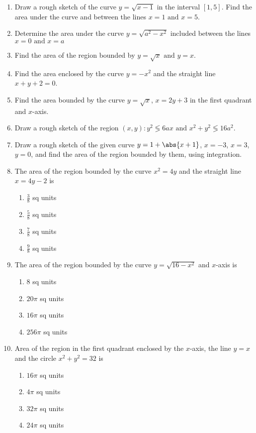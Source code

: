 \begin{enumerate}[label=\thesubsection.\arabic*,ref=\thesubsection.\theenumi]
\item Draw a rough sketch of the curve $y = \sqrt{x - 1}$ in the interval $[1, 5]$. Find the area under the curve and between the lines $x = 1\text{ and }x = 5$.
\item Determine the area under the curve $y = \sqrt{a^2 - x^2}$ included between the lines $x = 0\text{ and }x = a$
\item Find the area of the region bounded by $y = \sqrt{x}\text{ and }y = x$.
\item Find the area enclosed by the curve $y = - x^2$ and the straight line $x + y + 2 = 0$.
\item Find the area bounded by the curve $y = \sqrt{x}$, $x = 2y + 3$ in the first quadrant and $x$-axis.
\item Draw a rough sketch of the region ${(x, y) : y^2 \lessgtr 6ax\text{ and }x^2 + y^2 \lessgtr 16a^2}$.
\item Draw a  rough sketch of the given curve $y =1 + \abs{x + 1}$, $x = -3$, $x = 3$, $y = 0$, and find the area of the region bounded by them, using integration.
\item The area of the region bounded by the curve $x^2 = 4y$ and the straight line $x = 4y - 2$ is
\begin{enumerate}
\item $\frac{3}{8}$ sq units 
\item $\frac{5}{8}$ sq units
\item $\frac{7}{8}$ sq units 
\item $\frac{9}{8}$ sq units
\end{enumerate}
\item The area of the region bounded by the curve $y = \sqrt{16 - x^2}$ and $x$-axis is 
\begin{enumerate}
\item 8 sq units 
\item ${20\pi}$ sq units
\item ${16\pi}$ sq units
\item ${256\pi}$ sq units
\end{enumerate}
\item Area of the region in the first quadrant enclosed by the $x$-axis, the line $y = x$ and the circle $x^2 + y^2 = 32$ is 
\begin{enumerate}
\item ${16\pi}$ sq units 
\item ${4\pi}$ sq units
\item ${32\pi}$ sq units
\item ${24\pi}$ sq units

\end{enumerate}
\end{enumerate}
